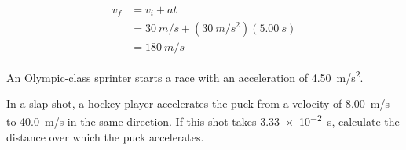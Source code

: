 \documentclass[../main-physics-problems.tex]{subfiles}
\begin{document}
\begin{questions}
\begin{parts}
\begin{solution}
    \begin{align*}
        v_f &= v_i + at \\[1ex]
        &= \SI{30}{m/s} + (\SI{30}{m/s^2})(\SI{5.00}{s}) \\[1ex]
        &= \boxed{\SI{180}{m/s}}
    \end{align*}    
\end{solution}
\end{parts}

\question \label{openstax-2.20}
An Olympic-class sprinter starts a race with an acceleration of \SI{4.50}{m/s^2}. 


\question \label{openstax-2.27}
In a slap shot, a hockey player accelerates the puck from a velocity of \SI{8.00}{m/s} to \SI{40.0}{m/s} in the same direction. If this shot takes \SI{3.33e-2}{s}, calculate the distance over which the puck accelerates.


\end{questions}
\end{document}
